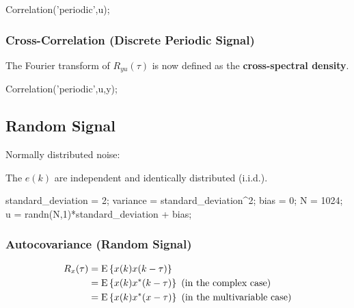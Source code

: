 \documentclass[10pt,a4paper]{scrartcl}
\begin{document}
\begin{multicols*}{2}
\begin{TPMatlab}
Correlation('periodic',u);
\end{TPMatlab}

\subsubsection{Cross-Correlation (Discrete Periodic Signal)}


The Fourier transform of $R_{yu}(\tau)$ is now defined as the \textbf{cross-spectral density}.


\begin{TPMatlab}
Correlation('periodic',u,y);
\end{TPMatlab}

\subsection{Random Signal}

Normally distributed noise:


The $e(k)$ are independent and identically distributed (i.i.d.).

\begin{TPMatlab}
standard_deviation = 2;
variance = standard_deviation^2;
bias = 0;
N = 1024;
u = randn(N,1)*standard_deviation + bias;
\end{TPMatlab}

\subsubsection{Autocovariance (Random Signal)}

\begin{align*}
R_x(\tau) &= \text{E}\left\{x(k)x(k-\tau)\right\}\\
&=\text{E}\left\{x(k)x^\ast(k-\tau)\right\} \text{ (in the complex case)}\\
&=\text{E}\left\{x(k)x^\ast(x-\tau)\right\} \text{ (in the multivariable case)}
\end{align*}


\end{multicols*}
\end{document}

